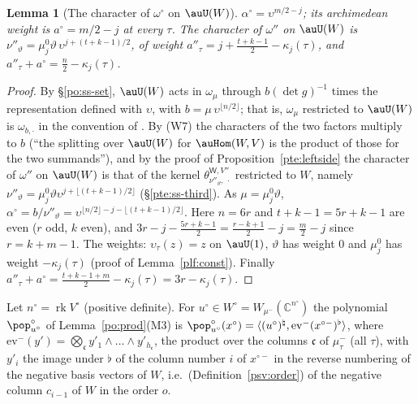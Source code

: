 \documentclass[10pt]{amsart}
\newtheorem{lemma}[theorem]{Lemma}
\theoremstyle{definition}
\theoremstyle{remark}
\newcommand{\C}{\mathbb C}
\begin{document}
\begin{lemma}[The character of $\omega^\circ$ on $\auU(W)$]\label{psv:char}
$\alpha^\circ=\upsilon^{m/2-j}$; its archimedean weight is $a^\circ=m/2-j$ at every $\tau$. The character of
$\omega''$ on $\auU(W)$ is $\nu''_\vartheta=\mu^0_j\vartheta\,\upsilon^{j+(t+k-1)/2}$, of weight
$a''_\tau=j+\frac{t+k-1}2-\kappa_j(\tau)$, and $a''_\tau+a^\circ=\frac n2-\kappa_j(\tau)$.
\end{lemma}
\begin{proof}
By \S\ref{po:ss-set}, $\auU(W)$ acts in $\omega_\mu$ through $b(\det g)^{-1}$ times the representation
defined with $\upsilon$, with $b=\mu\,\upsilon^{\lfloor n/2\rfloor}$; that is, $\omega_\mu$ restricted to $\auU(W)$ is
$\omega_{b,\cdot}$ in the convention of {\cite[\S2.3]{P53}}. By (W7) the characters of the two factors
multiply to $b$ (``the splitting over $\auU(W)$ for $\auHom(W,V)$ is the product of those for the two
summands''), and by the proof of Proposition~\ref{pte:leftside} the character of $\omega''$ on $\auU(W)$ is
that of the kernel $\theta^{\mathsf W,V''}_{\nu''_\vartheta,\,\cdot}$ restricted to $W$, namely $\nu''_\vartheta=\mu^0_j\vartheta
\upsilon^{j+\lfloor(t+k-1)/2\rfloor}$ (\S\ref{pte:ss-third}). As $\mu=\mu^0_j\vartheta$, $\alpha^\circ=b/\nu''_\vartheta=
\upsilon^{\lfloor n/2\rfloor-j-\lfloor(t+k-1)/2\rfloor}$. Here $n=6r$ and $t+k-1=5r+k-1$ are even ($r$ odd, $k$
even), and $3r-j-\frac{5r+k-1}2=\frac{r-k+1}2-j=\frac m2-j$ since $r=k+m-1$. The weights: $\upsilon_\tau(z)=z$ on
$\auU(1)$, $\vartheta$ has weight $0$ and $\mu^0_j$ has weight $-\kappa_j(\tau)$ (proof of Lemma~\ref{plf:const}).
Finally $a''_\tau+a^\circ=\frac{t+k-1+m}2-\kappa_j(\tau)=3r-\kappa_j(\tau)$.
\end{proof}

Let $n^\circ=\operatorname{rk}V^\circ$ (positive definite). For $u^\circ\in W^\circ=W_{\mu^-}(\C^{n^\circ})$ the
polynomial $\pop^\circ_{u^\circ}$ of Lemma~\ref{po:prod}(M3) is
$\pop^\circ_{u^\circ}(x^\circ)=\langle(u^\circ)^\natural,\mathrm{ev}^-(x^{\circ-})^\flat\rangle$, where
$\mathrm{ev}^-(y')=\bigotimes_{\mathfrak c}y'_1\wedge\dots\wedge y'_{h_{\mathfrak c}}$, the product over the columns
$\mathfrak c$ of $\mu^-_\tau$ (all $\tau$), with $y'_i$ the image under $\flat$ of the column number $i$ of
$x^{\circ-}$ in the reverse numbering of the negative basis vectors of $W$, i.e.\ (Definition~\ref{psv:order})
of the negative column $c_{i-1}$ of $W$ in the order $o$.
\end{document}

